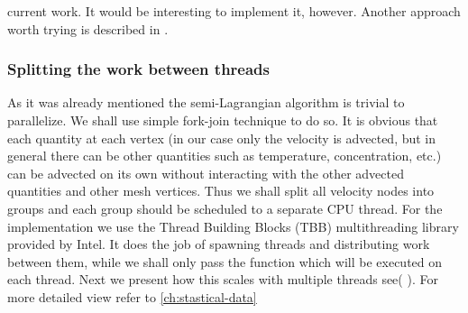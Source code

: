current work. It would be interesting to implement it, however. Another approach worth trying is described in \cite{Balanced-KD-Tree}.

\subsubsection{Splitting the work between threads}
As it was already mentioned the semi-Lagrangian algorithm is trivial to parallelize. We shall use simple fork-join technique to do so. It is obvious that each quantity at each vertex (in our case only the velocity is advected, but  in general there can be other quantities such as temperature, concentration, etc.) can be advected on its own without interacting with the other advected quantities and other mesh vertices. Thus we shall split all velocity nodes into groups and each group should be scheduled to a separate CPU thread. For the implementation we use the Thread Building Blocks (TBB) multithreading library provided by Intel. It does the job of spawning threads and distributing work between them, while we shall only pass the function which will be executed on each thread. Next we present how this scales with multiple threads see( ). For more detailed view refer to \cref{ch:stastical-data}

